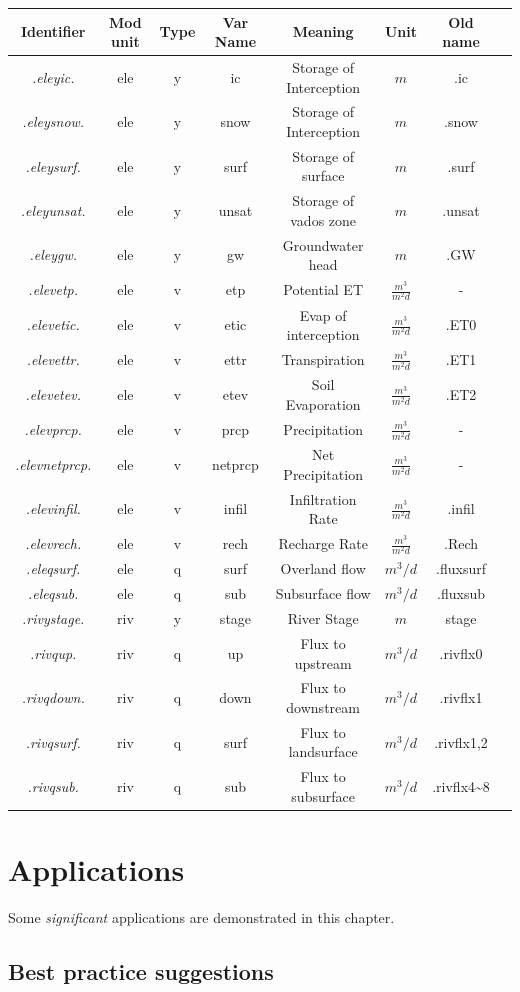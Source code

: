 \documentclass[]{scrbook}
\begin{document}
\begin{longtable}[]{@{}cccccccc@{}}
\toprule
Identifier & Mod unit & Type & Var Name & Meaning & Unit & Old name
&\tabularnewline
\midrule
\endhead
\emph{.eleyic.} & ele & y & ic & Storage of Interception & \(m\) & .ic
&\tabularnewline
\emph{.eleysnow.} & ele & y & snow & Storage of Interception & \(m\) &
.snow &\tabularnewline
\emph{.eleysurf.} & ele & y & surf & Storage of surface & \(m\) & .surf
&\tabularnewline
\emph{.eleyunsat.} & ele & y & unsat & Storage of vados zone & \(m\) &
.unsat &\tabularnewline
\emph{.eleygw.} & ele & y & gw & Groundwater head & \(m\) & .GW
&\tabularnewline
\emph{.elevetp.} & ele & v & etp & Potential ET & \(\frac{m^3}{m^2 d}\)
& - &\tabularnewline
\emph{.elevetic.} & ele & v & etic & Evap of interception &
\(\frac{m^3}{m^2 d}\) & .ET0 &\tabularnewline
\emph{.elevettr.} & ele & v & ettr & Transpiration &
\(\frac{m^3}{m^2 d}\) & .ET1 &\tabularnewline
\emph{.elevetev.} & ele & v & etev & Soil Evaporation &
\(\frac{m^3}{m^2 d}\) & .ET2 &\tabularnewline
\emph{.elevprcp.} & ele & v & prcp & Precipitation &
\(\frac{m^3}{m^2 d}\) & - &\tabularnewline
\emph{.elevnetprcp.} & ele & v & netprcp & Net Precipitation &
\(\frac{m^3}{m^2 d}\) & - &\tabularnewline
\emph{.elevinfil.} & ele & v & infil & Infiltration Rate &
\(\frac{m^3}{m^2 d}\) & .infil &\tabularnewline
\emph{.elevrech.} & ele & v & rech & Recharge Rate &
\(\frac{m^3}{m^2 d}\) & .Rech &\tabularnewline
\emph{.eleqsurf.} & ele & q & surf & Overland flow & \(m^3/d\) &
.fluxsurf &\tabularnewline
\emph{.eleqsub.} & ele & q & sub & Subsurface flow & \(m^3/d\) &
.fluxsub &\tabularnewline
\emph{.rivystage.} & riv & y & stage & River Stage & \(m\) & stage
&\tabularnewline
\emph{.rivqup.} & riv & q & up & Flux to upstream & \(m^3/d\) & .rivflx0
&\tabularnewline
\emph{.rivqdown.} & riv & q & down & Flux to downstream & \(m^3/d\) &
.rivflx1 &\tabularnewline
\emph{.rivqsurf.} & riv & q & surf & Flux to landsurface & \(m^3/d\) &
.rivflx1,2\tabularnewline
\emph{.rivqsub.} & riv & q & sub & Flux to subsurface & \(m^3/d\) &
.rivflx4\textasciitilde{}8 &\tabularnewline
\bottomrule
\end{longtable}

\chapter{Applications}\label{applications}

Some \emph{significant} applications are demonstrated in this chapter.

\section{Best practice suggestions}\label{best-practice-suggestions}
\end{document}
